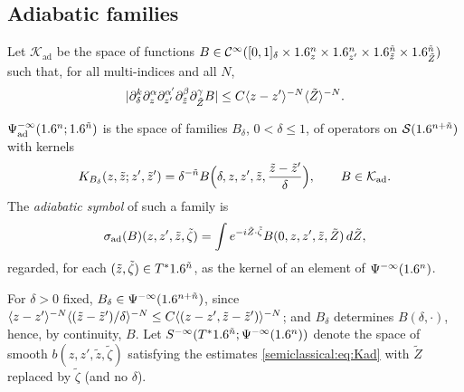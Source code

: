 \subsection{Adiabatic families}
Let $\mathcal K_{\mathrm{ad}}$ be the space of functions
$B\in\mathcal{C}^\infty([0,1]_\delta\times1.6^n_z\times1.6^n_{z'}\times1.6^{\tilde n}_{\tilde z}\times1.6^{\tilde n}_{\tilde Z})$
such that, for all multi-indices and all $N$,
\begin{equation}\label{semiclassical:eq:Kad}
  \lvert \partial^k_\delta\partial^\alpha_z\partial^{\alpha'}_{z'}\partial^\beta_{\tilde z}\partial^\gamma_{\tilde Z}B\rvert\le
  C\langle z-z'\rangle^{-N}\langle \tilde Z\rangle^{-N}.
\end{equation}

\begin{definition}\label{semiclassical:def:adiabatic}
  $\Psi^{-\infty}_{\mathrm{ad}}(1.6^n;1.6^{\tilde n})$ is the space of families $B_\delta$, $0<\delta\le1$, of
  operators on $\mathcal{S}(1.6^{n+\tilde n})$ with kernels
  \begin{equation*}
    K_{B_\delta}(z,\tilde z;z',\tilde z')=\delta^{-\tilde n}B\Bigl(\delta,z,z',\tilde z,\frac{\tilde z-\tilde z'}\delta\Bigr),
    \qquad B\in\mathcal K_{\mathrm{ad}}.
  \end{equation*}
  The \emph{adiabatic symbol} of such a family is
  \begin{equation*}
    \sigma_{\mathrm{ad}}(B)(z,z',\tilde z,\tilde\zeta)=\int e^{-i\tilde Z\cdot\tilde\zeta}B(0,z,z',\tilde z,\tilde Z)\,d\tilde Z,
  \end{equation*}
  regarded, for each $(\tilde z,\tilde\zeta)\in T^*1.6^{\tilde n}$, as the kernel of an element of
  $\Psi^{-\infty}(1.6^n)$.
\end{definition}

For $\delta>0$ fixed, $B_\delta\in\Psi^{-\infty}(1.6^{n+\tilde n})$, since
$\langle z-z'\rangle^{-N}\langle (\tilde z-\tilde z')/\delta\rangle^{-N}\le C\langle (z-z',\tilde z-\tilde z')\rangle^{-N}$;
and $B_\delta$ determines $B(\delta,\cdot)$, hence, by continuity, $B$. Let
$S^{-\infty}(T^*1.6^{\tilde n};\Psi^{-\infty}(1.6^n))$ denote the space of smooth
$b(z,z',\tilde z,\tilde\zeta)$ satisfying the estimates
\eqref{semiclassical:eq:Kad} with $\tilde Z$ replaced by $\tilde\zeta$ (and no $\delta$).

